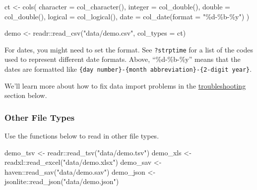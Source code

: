 \documentclass[
  oneside]{book}
\newenvironment{Shaded}{\begin{snugshade}}{\end{snugshade}}
\newcommand{\AttributeTok}[1]{\textcolor[rgb]{0.77,0.63,0.00}{#1}}
\newcommand{\FunctionTok}[1]{\textcolor[rgb]{0.00,0.00,0.00}{#1}}
\newcommand{\NormalTok}[1]{#1}
\newcommand{\OtherTok}[1]{\textcolor[rgb]{0.56,0.35,0.01}{#1}}
\newcommand{\SpecialCharTok}[1]{\textcolor[rgb]{0.00,0.00,0.00}{#1}}
\newcommand{\StringTok}[1]{\textcolor[rgb]{0.31,0.60,0.02}{#1}}
\begin{document}
\begin{Shaded}
\begin{Highlighting}[]
\NormalTok{ct }\OtherTok{\textless{}{-}} \FunctionTok{cols}\NormalTok{(}
  \AttributeTok{character =} \FunctionTok{col\_character}\NormalTok{(),}
  \AttributeTok{integer =} \FunctionTok{col\_double}\NormalTok{(),}
  \AttributeTok{double =} \FunctionTok{col\_double}\NormalTok{(),}
  \AttributeTok{logical =} \FunctionTok{col\_logical}\NormalTok{(),}
  \AttributeTok{date =} \FunctionTok{col\_date}\NormalTok{(}\AttributeTok{format =} \StringTok{"\%d{-}\%b{-}\%y"}\NormalTok{)}
\NormalTok{)}

\NormalTok{demo  }\OtherTok{\textless{}{-}}\NormalTok{ readr}\SpecialCharTok{::}\FunctionTok{read\_csv}\NormalTok{(}\StringTok{"data/demo.csv"}\NormalTok{, }\AttributeTok{col\_types =}\NormalTok{ ct)}
\end{Highlighting}
\end{Shaded}

\begin{info}
For dates, you might need to set the format. See \texttt{?strptime} for a list of the codes used to represent different date formats. Above, {``\%d-\%b-\%y''} means that the dates are formatted like \texttt{\{day\ number\}-\{month\ abbreviation\}-\{2-digit\ year\}}.

\end{info}

We'll learn more about how to fix data import problems in the \protect\hyperlink{troubleshooting}{troubleshooting} section below.

\hypertarget{other-file-types}{%
\subsubsection{Other File Types}\label{other-file-types}}

Use the functions below to read in other file types.

\begin{Shaded}
\begin{Highlighting}[]
\NormalTok{demo\_tsv  }\OtherTok{\textless{}{-}}\NormalTok{ readr}\SpecialCharTok{::}\FunctionTok{read\_tsv}\NormalTok{(}\StringTok{"data/demo.tsv"}\NormalTok{)}
\NormalTok{demo\_xls  }\OtherTok{\textless{}{-}}\NormalTok{ readxl}\SpecialCharTok{::}\FunctionTok{read\_excel}\NormalTok{(}\StringTok{"data/demo.xlsx"}\NormalTok{)}
\NormalTok{demo\_sav  }\OtherTok{\textless{}{-}}\NormalTok{ haven}\SpecialCharTok{::}\FunctionTok{read\_sav}\NormalTok{(}\StringTok{"data/demo.sav"}\NormalTok{)}
\NormalTok{demo\_json }\OtherTok{\textless{}{-}}\NormalTok{ jsonlite}\SpecialCharTok{::}\FunctionTok{read\_json}\NormalTok{(}\StringTok{"data/demo.json"}\NormalTok{)}
\end{Highlighting}
\end{Shaded}
\end{document}
